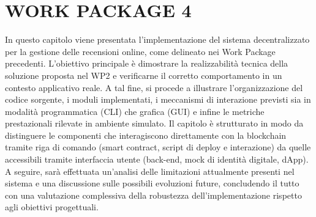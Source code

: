 \chapter{WORK PACKAGE 4}
    In questo capitolo viene presentata l'implementazione del sistema decentralizzato per la gestione delle recensioni online, come delineato nei Work Package precedenti. L'obiettivo principale è dimostrare la realizzabilità tecnica della soluzione proposta nel WP2 e verificarne il corretto comportamento in un contesto applicativo reale. A tal fine, si procede a illustrare l'organizzazione del codice sorgente, i moduli implementati, i meccanismi di interazione previsti sia in modalità programmatica (CLI) che grafica (GUI) e infine le metriche prestazionali rilevate in ambiente simulato.
    Il capitolo è strutturato in modo da distinguere le componenti che interagiscono direttamente con la blockchain tramite riga di comando (smart contract, script di deploy e interazione) da quelle accessibili tramite interfaccia utente (back-end, mock di identità digitale, dApp). A seguire, sarà effettuata un'analisi delle limitazioni attualmente presenti nel sistema e una discussione sulle possibili evoluzioni future, concludendo il tutto con una valutazione complessiva della robustezza dell'implementazione rispetto agli obiettivi progettuali.

